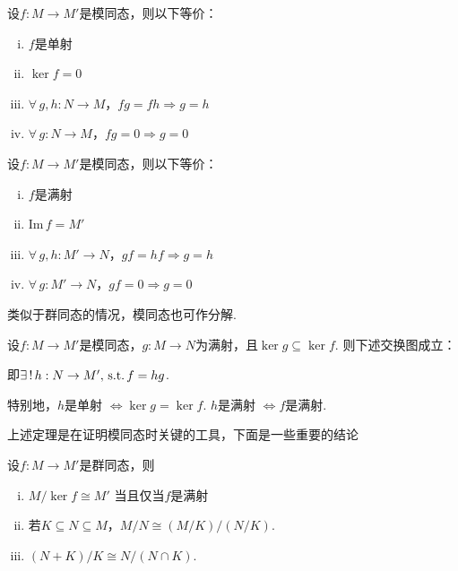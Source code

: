 \begin{proposition}[单射的等价条件]
    设$f: M \to M'$是模同态，则以下等价：
    \begin{enumerate}[(i)]
        \item $f$是单射
        \item $\ker f = 0$
        \item $\forall\, g, h: N \to M$，$fg = fh \Rightarrow g = h$
        \item $\forall\, g: N \to M$，$fg = 0 \Rightarrow g = 0$
    \end{enumerate}
\end{proposition}

\begin{proposition}[满射的等价条件]
    设$f: M \to M'$是模同态，则以下等价：
    \begin{enumerate}[(i)]
        \item $f$是满射
        \item $\mathrm{Im}\, f = M'$
        \item $\forall\, g, h: M' \to N$，$gf = hf \Rightarrow g = h$
        \item $\forall\, g: M' \to N$，$gf = 0 \Rightarrow g = 0$
    \end{enumerate}
    
\end{proposition}

类似于群同态的情况，模同态也可作分解.

\begin{theorem}
    设$f: M \to M'$是模同态，$g: M \to N$为满射，且$\ker g \subseteq \ker f$. 则下述交换图成立：
    \begin{center}
    \end{center}
    即$\exists\, !\, h: N \to M',\operatorname{\,\text{s.t.}} f = hg$.\par
    特别地，$h$是单射 $\Leftrightarrow \ker g = \ker f$.
    $h$是满射 $\Leftrightarrow f$是满射.
\end{theorem}

上述定理是在证明模同态时关键的工具，下面是一些重要的结论

\begin{theorem}[]
    设$f: M \to M'$是群同态，则
    \begin{enumerate}[(i)]
        \item $M / \ker f \cong M'$ 当且仅当$f$是满射
        \item 若$K \subseteq N \subseteq M$，$M / N \cong (M / K) / (N / K)$.
        \item $(N + K) / K \cong N / (N \cap K)$.
    \end{enumerate}
\end{theorem}

